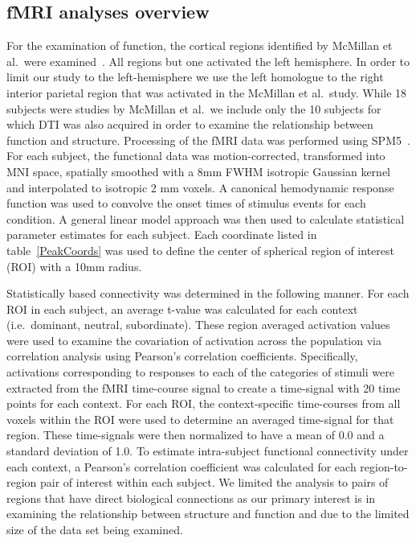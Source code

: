\subsection{fMRI analyses overview}
For the examination of function, the cortical regions identified by McMillan et al.\ were examined~\cite{McMillan2010}. All regions but one activated the left hemisphere. In order to limit our study to the left-hemisphere we use the left homologue to the right interior parietal region that was activated in the McMillan et al.\ study. While 18 subjects were studies by McMillan et al.\, we include only the 10 subjects for which DTI was also acquired in order to examine the relationship between function and structure. Processing of the fMRI data was performed using SPM5~\cite{SPM5}. For each subject, the functional data was motion-corrected, transformed into MNI space, spatially smoothed with a 8mm FWHM isotropic Gaussian kernel and interpolated to isotropic 2 mm voxels. A canonical hemodynamic response function was used to convolve the onset times of stimulus events for each condition. A general linear model approach was then used to calculate statistical parameter estimates for each subject. Each coordinate listed in table~\ref{PeakCoords} was used to define the center of spherical region of interest (ROI) with a 10mm radius. 

Statistically based connectivity was determined in the following manner. For each ROI in each subject, an average t-value was calculated for each context (i.e.\ dominant, neutral, subordinate). These region averaged activation values were used to examine the covariation of activation across the population via correlation analysis using Pearson's correlation coefficients. Specifically, activations corresponding to responses to each of the categories of stimuli were extracted from the fMRI time-course signal to create a time-signal with 20 time points for each context. For each ROI, the context-specific time-courses from all voxels within the ROI were used to determine an averaged time-signal for that region. These time-signals were then normalized to have a mean of 0.0 and a standard deviation of 1.0. To estimate intra-subject functional connectivity under each context, a Pearson's correlation coefficient was calculated for each region-to-region pair of interest within each subject. We limited the analysis to pairs of regions that have direct biological connections as our primary interest is in examining the relationship between structure and function and due to the limited size of the data set being examined.

